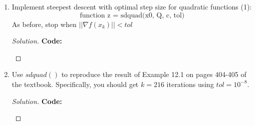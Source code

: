 \documentclass[12pt]{article}
\makeatletter
\theoremstyle{homework}
\newenvironment{exercise}[1]
{\def\@currentlabel{#1}\exercisecore}
{\endexercisecore}
\makeatother
\begin{document}
\begin{exercise}{P14} 
  \begin{enumerate}
    \item[(a)] Implement steepest descent with optimal step size for quadratic functions (1):
    \begin{equation*}
      \text{function z = sdquad(x0, Q, c, tol)}
    \end{equation*}
    As before, stop when $||\nabla f(x_k)|| < tol$
    \begin{proof}[Solution]

      \textbf{Code:}
      \begin{center}
        
      \end{center}
    \end{proof}
\vspace{.15in}

    \item[(b)] Use $sdquad()$ to reproduce the result of Example 12.1 on pages 404-405 of 
    the textbook. Specifically, you should get $k = 216$ iterations using $tol = 10^{-8}$.
    \begin{proof}[Solution]
  
      \textbf{Code:}
      \begin{center}
        
      \end{center}
    \end{proof}
    \vspace{.15in}


\end{enumerate}
\end{exercise}
\end{document}
